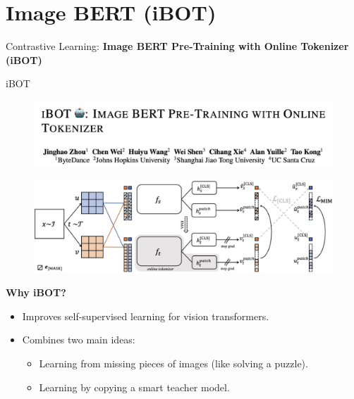 \section{Image BERT (iBOT)}
\begin{frame}{}
    \LARGE Contrastive Learning: \textbf{Image BERT Pre-Training with Online Tokenizer (iBOT)}
\end{frame}


\begin{frame}[allowframebreaks]{iBOT}
\begin{figure}
    \centering
    \includegraphics[width=\linewidth,height=0.9\textheight,keepaspectratio]{images/contrastive/slide_91_2_img.png}
\end{figure}
    \begin{figure}
    \centering
    \includegraphics[width=\linewidth,height=0.9\textheight,keepaspectratio]{images/contrastive/slide_91_1_img.png}
\end{figure}

\framebreak

\textbf{Why iBOT?}
\begin{itemize}
    \item Improves self-supervised learning for vision transformers.
    \item Combines two main ideas:
    \begin{itemize}
        \item Learning from missing pieces of images (like solving a puzzle).
        \item Learning by copying a smart teacher model.
    \end{itemize}
\end{itemize}

\framebreak


\end{frame}
